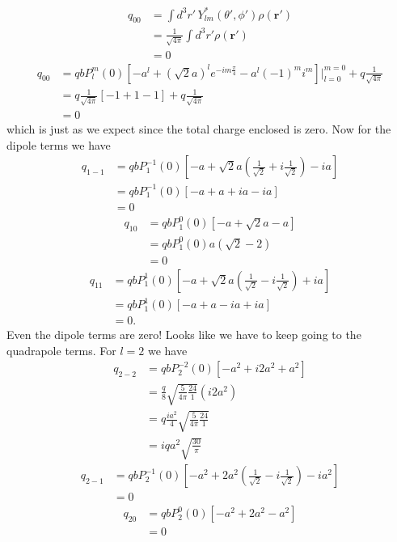 \documentclass[11pt,letterpaper]{article}
\newcommand{\vect}[1]{\mathbf{#1}}
\begin{document}
\begin{enumerate}
\begin{enumerate}[label=\Roman*.]
\begin{align*}q_{00} &= \int{d^3r'\,Y^*_{lm}(\theta',\phi')\rho(\vect r')}\\
&=\frac{1}{\sqrt{4\pi}}\int{d^3r' \rho(\vect r')}\\
&= 0 
\end{align*} 
\begin{align*}q_{00} &= qbP_l^m(0)[-a^l+(\sqrt 2 a)^le^{-im\frac{\pi}{4}}-a^l(-1)^mi^m]|_{l=0}^{m=0}+q\frac{1}{\sqrt{4\pi}}\\
&=q\frac{1}{\sqrt{4\pi}}[-1+1-1]+q\frac{1}{\sqrt{4\pi}}\\
&=0
\end{align*}
which is just as we expect since the total charge enclosed is zero. Now for the dipole terms we have
\begin{align*}
q_{1-1}&=qbP_1^{-1}(0)[-a+\sqrt 2a\left(\frac{1}{\sqrt 2}+i\frac{1}{\sqrt 2}\right)-ia]\\
&=qbP_1^{-1}(0)[-a+a+ia-ia]\\
&=0
\end{align*}
\begin{align*}
q_{10}&=qbP_1^{0}(0)[-a+\sqrt 2a-a]\\
&=qbP_1^{0}(0)a(\sqrt 2-2)\\
&=0
\end{align*}
\begin{align*}
q_{11}&=qbP_1^{1}(0)[-a+\sqrt 2a\left(\frac{1}{\sqrt 2}-i\frac{1}{\sqrt 2}\right)+ia]\\
&=qbP_1^{1}(0)[-a+a-ia+ia]\\
&=0.
\end{align*}
Even the dipole terms are zero! Looks like we have to keep going to the quadrapole terms. For $l=2$ we have
\begin{align*}
q_{2-2}&=qbP_2^{-2}(0)[-a^2+i2a^2+a^2]\\
&=\frac{q}{8}\sqrt{\frac{5}{4\pi}\frac{24}{1}}(i2a^2)\\
&=q\frac{ia^2}{4}\sqrt{\frac{5}{4\pi}\frac{24}{1}}\\
&=iqa^2\sqrt{\frac{30}{\pi}}
\end{align*}
\begin{align*}
q_{2-1}&=qbP_2^{-1}(0)[-a^2+2a^2\left(\frac{1}{\sqrt 2}-i\frac{1}{\sqrt 2}\right)-ia^2]\\
&=0
\end{align*}
\begin{align*}
q_{20}&=qbP_2^{0}(0)[-a^2+2a^2-a^2]\\
&=0
\end{align*}
\begin{align*}

\end{align*}
\end{enumerate}
\end{enumerate}
\end{document}
